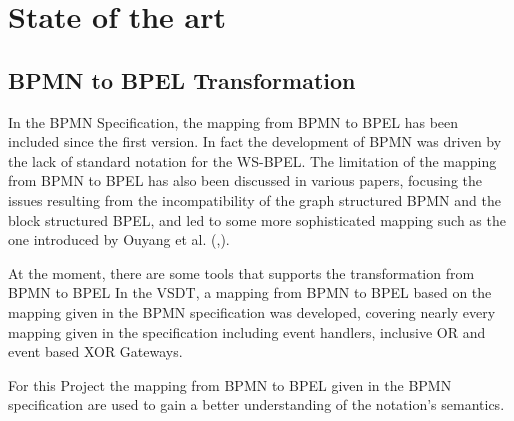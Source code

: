 \chapter{State of the art}

\section{BPMN to BPEL Transformation}
In the BPMN Specification, the mapping from BPMN to BPEL has been included since the first version. In fact the development of BPMN was driven by the lack of standard notation for the WS-BPEL\cite{weidlich2008}. The limitation of the mapping from BPMN to BPEL has also been discussed in various papers, focusing the issues resulting from the incompatibility of the graph structured BPMN and the block structured BPEL, and led to some more sophisticated mapping such as the one introduced by Ouyang et al. (\cite{Ouyang2006a},\cite{Ouyang2006b}).

At the moment, there are some tools that supports the transformation from BPMN to BPEL 
In the VSDT, a mapping from BPMN to BPEL based on the mapping given in the BPMN specification was developed, covering nearly every mapping given in the specification including event handlers, inclusive OR and event based XOR Gateways. 

For this Project the mapping from BPMN to BPEL given in the BPMN specification are used to gain a better understanding of the notation's semantics.


